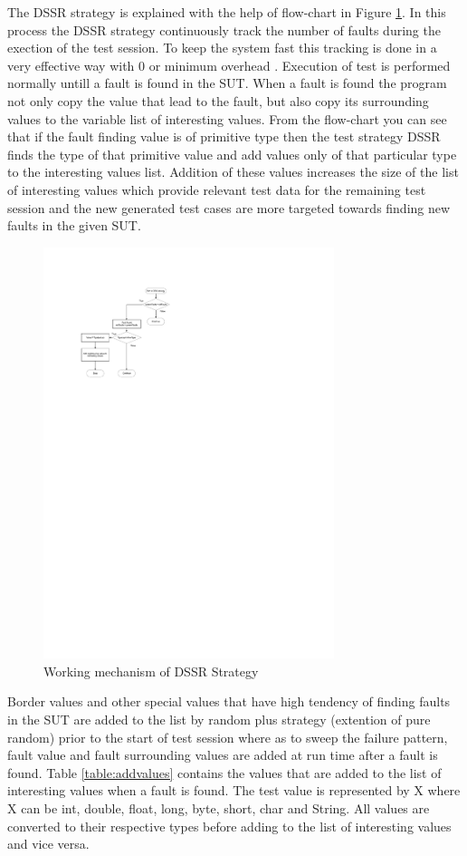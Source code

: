 \hspace{10 mm}The DSSR strategy is explained with the help of flow-chart in Figure \ref{fig:Working_DSSS}. In this process the DSSR strategy continuously track the number of faults during the exection of the test session. To keep the system fast this tracking is done in a very effective way with 0 or minimum overhead \cite{Leitner2009}. Execution of test is performed normally untill a fault is found in the SUT. When a fault is found the program not only copy the value that lead to the fault, but also copy its surrounding values to the variable list of interesting values. From the flow-chart you can see that if the fault finding value is of primitive type then the test strategy DSSR finds the type of that primitive value and add values only of that particular type to the interesting values list. Addition of these values increases the size of the list of interesting values which provide relevant test data for the remaining test session and the new generated test cases are more targeted towards finding new faults in the given SUT.\\

\begin{figure}[htp]
\centering
\includegraphics[width=8.5cm,height=12cm]{figures/flowchart1.pdf}
\caption{Working mechanism of DSSR Strategy}
\label{fig:Working_DSSS}
\end{figure}

Border values and other special values that have high tendency of finding faults in the SUT are added to the list by random plus strategy (extention of pure random) prior to the start of test session where as to sweep the failure pattern, fault value and fault surrounding values are added at run time after a fault is found. Table \ref{table:addvalues} contains the values that are added to the list of interesting values when a fault is found. The test value is represented by X where X can be int, double, float, long, byte, short, char and String. All values are converted to their respective types before adding to the list of interesting values and vice versa.

